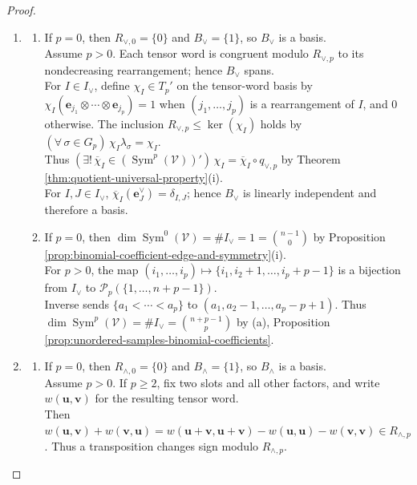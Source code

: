\begin{theorem}
\begin{proof}
\begin{enumerate}[label=(\roman*)]
\setlength{\itemsep}{0pt}
\item
\begin{enumerate}[label=(\alph*)]
\setlength{\itemsep}{0pt}
\item If $p=0$, then $R_{\vee,0}=\{0\}$ and $B_{\vee}=\{1\}$, so $B_{\vee}$ is a basis.\\
Assume $p>0$. Each tensor word is congruent modulo $R_{\vee,p}$ to its nondecreasing rearrangement; hence $B_{\vee}$ spans.\\
For $I\in I_{\vee}$, define $\chi_I\in T_p'$ on the tensor-word basis by $\chi_I(\mathbf{e}_{j_1}\otimes\cdots\otimes\mathbf{e}_{j_p})=1$ when $(j_1,\ldots,j_p)$ is a rearrangement of $I$, and $0$ otherwise. The inclusion $R_{\vee,p}\leq\ker(\chi_I)$ holds by $(\forall\,\sigma\in G_p)\,\chi_I\lambda_{\sigma}=\chi_I$.\\
Thus $(\exists!\,\overline{\chi}_I\in(\operatorname{Sym}^{p}(\mathcal{V}))')\,\chi_I=\overline{\chi}_I\circ q_{\vee,p}$ by Theorem \ref{thm:quotient-universal-property}(i).\\
For $I,J\in I_{\vee}$, $\overline{\chi}_I(\mathbf{e}_{J}^{\vee})=\delta_{I,J}$; hence $B_{\vee}$ is linearly independent and therefore a basis.
\item If $p=0$, then $\dim\operatorname{Sym}^{0}(\mathcal{V})=\#I_{\vee}=1=\binom{n-1}{0}$ by Proposition \ref{prop:binomial-coefficient-edge-and-symmetry}(i).\\
For $p>0$, the map $(i_1,\ldots,i_p)\mapsto\{i_1,i_2+1,\ldots,i_p+p-1\}$ is a bijection from $I_{\vee}$ to $\mathcal{P}_p(\{1,\ldots,n+p-1\})$.\\
Inverse sends $\{a_1<\cdots<a_p\}$ to $(a_1,a_2-1,\ldots,a_p-p+1)$. Thus $\dim\operatorname{Sym}^{p}(\mathcal{V})=\#I_{\vee}=\binom{n+p-1}{p}$ by (a), Proposition \ref{prop:unordered-samples-binomial-coefficients}.
\end{enumerate}
\item
\begin{enumerate}[label=(\alph*)]
\setlength{\itemsep}{0pt}
\item If $p=0$, then $R_{\wedge,0}=\{0\}$ and $B_{\wedge}=\{1\}$, so $B_{\wedge}$ is a basis.\\
Assume $p>0$. If $p\geq2$, fix two slots and all other factors, and write $w(\mathbf{u},\mathbf{v})$ for the resulting tensor word.\\
Then $w(\mathbf{u},\mathbf{v})+w(\mathbf{v},\mathbf{u})=w(\mathbf{u}+\mathbf{v},\mathbf{u}+\mathbf{v})-w(\mathbf{u},\mathbf{u})-w(\mathbf{v},\mathbf{v})\in R_{\wedge,p}$. Thus a transposition changes sign modulo $R_{\wedge,p}$.\\

\end{enumerate}
\end{enumerate}
\end{proof}
\end{theorem}

